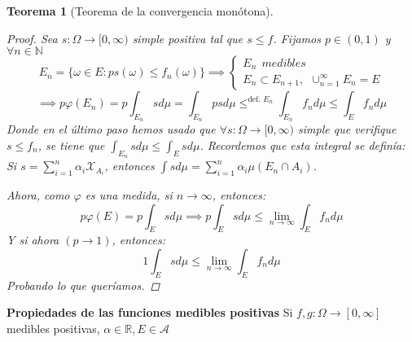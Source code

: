 \documentclass[11pt, a4paper]{article}
\newcommand{\R}{\mathbb{R}}
\theoremstyle{theorem-style}
\newtheorem{nth}{Teorema}[section]
\theoremstyle{definition-style}
\theoremstyle{remark-style}
\theoremstyle{example-style}
\begin{document}
\begin{nth}[Teorema de la convergencia monótona]
\begin{proof}
Sea $s: \Omega \to [0,\infty)$ simple positiva tal que $s \leq f$. Fijamos $p \in (0,1)$ y $\forall n \in \mathbb{N}$
\[
E_n= \{\omega \in E : ps(\omega) \leq f_n(\omega)\}\implies \begin{cases}
	E_n \ \ medibles \\
	E_n \subset E_{n+1}, \ \ \cup_{n=1}^\infty E_n = E
\end{cases}
\]
\[
\implies p\varphi(E_n) = p \int_{E_n} s d\mu = \int_{E_n} ps d \mu \leq^{\text{def. $E_n$}} \int_{E_n}f_n d\mu \leq \int_E f_n d\mu
\]
Donde en el último paso hemos usado que $\forall s:\Omega \to [0,\infty)$ simple que verifique $s\leq f_n$, se tiene que $\int_{E_n}sd\mu \leq \int_E s d \mu$. Recordemos que esta integral se definía:
Si $s= \sum_{i=1}^n \alpha_i \mathcal{X}_{A_i}$, entonces $\int s d\mu = \sum_{i=1}^n \alpha_i \mu(E_n \cap A_i)$.

Ahora, como $\varphi$ es una medida, si $n \to \infty$, entonces: 
$$p \varphi(E) =  p\int_E s d\mu \implies p \int_E sd\mu \leq \lim_{n\to \infty}\int_E f_n d\mu$$
Y si ahora $(p\to 1)$, entonces:
\[
1 \int_E s d\mu \leq \lim_{n\to \infty}\int_E f_n d\mu
\]
Probando lo que queríamos.
\end{proof}
\end{nth}

\textbf{Propiedades de las funciones medibles positivas}
Si $f,g:\Omega \to [0,\infty]$ medibles positivas, $\alpha \in \R, E \in \mathcal{A}$
\end{document}
